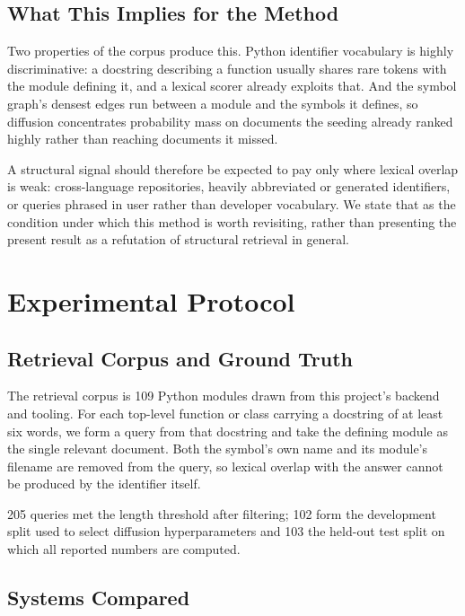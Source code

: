 \documentclass[10pt,twocolumn,letterpaper]{article}
\begin{document}
\subsection{What This Implies for the Method}


Two properties of the corpus produce this. Python identifier vocabulary is highly
discriminative: a docstring describing a function usually shares rare tokens with
the module defining it, and a lexical scorer already exploits that. And the symbol
graph's densest edges run between a module and the symbols it defines, so diffusion
concentrates probability mass on documents the seeding already ranked highly rather
than reaching documents it missed.

A structural signal should therefore be expected to pay only where lexical overlap
is weak: cross-language repositories, heavily abbreviated or generated identifiers,
or queries phrased in user rather than developer vocabulary. We state that as the
condition under which this method is worth revisiting, rather than presenting the
present result as a refutation of structural retrieval in general.




\section{Experimental Protocol}



\subsection{Retrieval Corpus and Ground Truth}


The retrieval corpus is 109 Python modules drawn from this project's backend and tooling. For each top-level function or class carrying a docstring of at least six words, we form a query from that docstring and take the defining module as the single relevant document. Both the symbol's own name and its module's filename are removed from the query, so lexical overlap with the answer cannot be produced by the identifier itself.

205 queries met the length threshold after filtering; 102 form the development split used to select diffusion hyperparameters and 103 the held-out test split on which all reported numbers are computed.


\subsection{Systems Compared}
\end{document}

